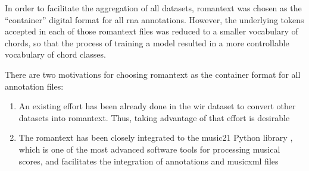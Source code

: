 
In order to facilitate the aggregation of all datasets,
\gls{romantext} was chosen as the ``container'' digital
format for all \gls{rna} annotations. However, the
underlying tokens accepted in each of those \gls{romantext}
files was reduced to a smaller vocabulary of chords, so that
the process of training a model resulted in a more
controllable vocabulary of chord classes.

There are two motivations for choosing \gls{romantext} as
the container format for all annotation files:

\begin{enumerate}
    \item An existing effort has been already done in the
    \gls{wir} dataset \parencite{gotham2019romantext,
    gotham2022openscore} to convert other datasets into
    \gls{romantext}. Thus, taking advantage of that effort
    is desirable
    \item The \gls{romantext} has been closely integrated to
    the music21 Python library
    \parencite{cuthbert2010music21}, which is one of the
    most advanced software tools for processing musical
    scores, and facilitates the integration of annotations
    and \gls{musicxml} files
\end{enumerate}